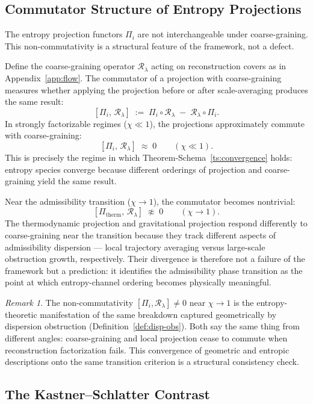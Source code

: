 \documentclass[11pt, a4paper]{article}
\theoremstyle{plain}
\theoremstyle{definition}
\theoremstyle{remark}
\newtheorem{remark}[theorem]{Remark}
\newcommand{\Rcoarse}{\mathcal{R}_\lambda}
\begin{document}
\subsection{Commutator Structure of Entropy Projections}
\label{sec:commutator}

The entropy projection functors $\Pi_i$ are not interchangeable under coarse-graining.
This non-commutativity is a structural feature of the framework, not a defect.

Define the coarse-graining operator $\Rcoarse$ acting on reconstruction covers as in
Appendix~\ref{app:flow}. The commutator of a projection with coarse-graining measures
whether applying the projection before or after scale-averaging produces the same
result:
\[
  [\Pi_i,\, \Rcoarse] \;:=\; \Pi_i \circ \Rcoarse \;-\; \Rcoarse \circ \Pi_i.
\]
In strongly factorizable regimes ($\chi \ll 1$), the projections approximately commute
with coarse-graining:
\[
  [\Pi_i,\, \Rcoarse] \;\approx\; 0 \qquad (\chi \ll 1).
\]
This is precisely the regime in which Theorem-Schema~\ref{ts:convergence} holds:
entropy species converge because different orderings of projection and coarse-graining
yield the same result.

Near the admissibility transition ($\chi \to 1$), the commutator becomes nontrivial:
\[
  [\Pi_{\mathrm{therm}},\, \Rcoarse] \;\not\approx\; 0 \qquad (\chi \to 1).
\]
The thermodynamic projection and gravitational projection respond differently to
coarse-graining near the transition because they track different aspects of
admissibility dispersion --- local trajectory averaging versus large-scale obstruction
growth, respectively. Their divergence is therefore not a failure of the framework
but a prediction: it identifies the admissibility phase transition as the point at
which entropy-channel ordering becomes physically meaningful.

\begin{remark}
The non-commutativity $[\Pi_i, \Rcoarse] \neq 0$ near $\chi \to 1$ is the entropy-
theoretic manifestation of the same breakdown captured geometrically by dispersion
obstruction (Definition~\ref{def:disp-obs}). Both say the same thing from different
angles: coarse-graining and local projection cease to commute when reconstruction
factorization fails. This convergence of geometric and entropic descriptions onto the
same transition criterion is a structural consistency check.
\end{remark}

\subsection{The Kastner--Schlatter Contrast}
\end{document}
